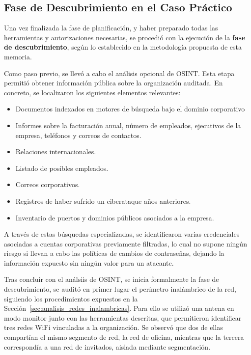 \documentclass[a4paper, 11pt]{article}
\begin{document}
\par\vspace{0.5cm}
\subsection{Fase de Descubrimiento en el Caso Práctico}

Una vez finalizada la fase de planificación, y haber preparado todas las herramientas y autorizaciones necesarias, se procedió con la ejecución de la \textbf{fase de descubrimiento}, según lo establecido en la metodología propuesta de esta memoria.

\par\vspace{0.5cm}

Como paso previo, se llevó a cabo el análisis opcional de OSINT. Esta etapa permitió obtener información pública sobre la organización auditada. En concreto, se localizaron los siguientes elementos relevantes:

\begin{itemize}
    \item Documentos indexados en motores de búsqueda bajo el dominio corporativo
    \item Informes sobre la facturación anual, número de empleados, ejecutivos de la empresa, teléfonos y correos de contactos.
    \item Relaciones internacionales.
    \item Listado de posibles empleados.
    \item Correos corporativos.
    \item Registros de haber sufrido un ciberataque años anteriores.
    \item Inventario de puertos y dominios públicos asociados a la empresa.
\end{itemize}

\par\vspace{0.5cm}

A través de estas búsquedas especializadas, se identificaron varias credenciales asociadas a cuentas corporativas previamente filtradas, lo cual no supone ningún riesgo si llevan a cabo las políticas de cambios de contraseñas, dejando la información expuesto sin ningún valor para un atacante.

\par\vspace{0.5cm}

Tras concluir con el análsiis de OSINT, se inicia formalmente la fase de descubrimiento, se auditó en primer lugar el perímetro inalámbrico de la red, 
siguiendo los procedimientos expuestos en la Sección~\ref{sec:analisis_redes_inalambricas}. 
Para ello se utilizó una antena en modo monitor junto con las herramientas descritas, que permitieron identificar tres redes WiFi vinculadas a la organización. Se observó que dos de ellas compartían el mismo segmento de red, la red de oficina, mientras que la tercera correspondía a una red de invitados, aislada mediante segmentación.
\end{document}
